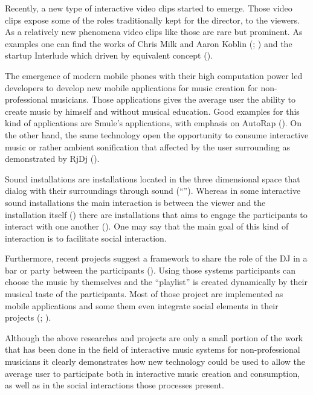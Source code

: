 Recently, a new type of interactive video clips started to emerge.
Those video clips expose some of the roles traditionally kept for the director, to the viewers.
As a relatively new phenomena video clips like those are rare but prominent.
As examples one can find the works of Chris Milk and Aaron Koblin (\cite{web:milk1}; \cite{web:milk2}) and the startup Interlude which driven by equivalent concept (\cite{web:interlude}).

The emergence of modern mobile phones with their high computation power led developers to develop new mobile applications for music creation for non-professional musicians.
Those applications gives the average user the ability to create music by himself and without musical education.
Good examples for this kind of applications are Smule's applications, with emphasis on AutoRap (\cite{web:autorap}).
On the other hand, the same technology open the opportunity to consume interactive music or rather ambient sonification that affected by the user surrounding as demonstrated by RjDj (\cite{web:rjdj})\label{rjdj}.

Sound installations are installations located in the three dimensional space that dialog with their surroundings through sound (``'').
Whereas in some interactive sound installations the main interaction is between the viewer and the installation itself (\cite{web:visnjic}) there are installations that aims to engage the participants to interact with one another (\cite{eng03}).
One may say that the main goal of this kind of interaction is to facilitate social interaction.

Furthermore, recent projects suggest a framework to share the role of the DJ in a bar or party between the participants (\cite{web:shaw}).
Using those systems participants can choose the music by themselves and the ``playlist'' is created dynamically by their musical taste of the participants.
Most of those project are implemented as mobile applications and some them even integrate social elements in their projects (\cite{web:playmysong}; \cite{web:lammers}).

Although the above researches and projects are only a small portion of the work that has been done in the field of interactive music systems for non-professional musicians it clearly demonstrates how new technology could be used to allow the average user to participate both in interactive music creation and consumption, as well as in the social interactions those processes present.

